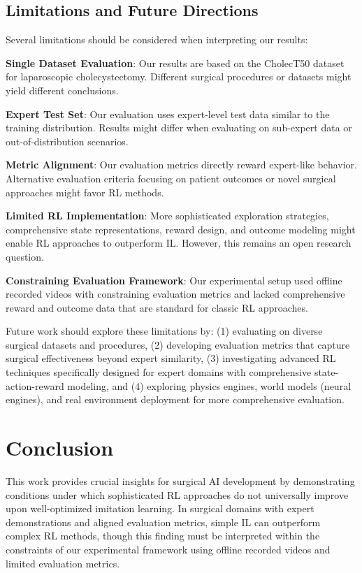 \documentclass[runningheads]{llncs}
\begin{document}
\subsection{Limitations and Future Directions}

Several limitations should be considered when interpreting our results:

\textbf{Single Dataset Evaluation}: Our results are based on the CholecT50 dataset for laparoscopic cholecystectomy. Different surgical procedures or datasets might yield different conclusions.

\textbf{Expert Test Set}: Our evaluation uses expert-level test data similar to the training distribution. Results might differ when evaluating on sub-expert data or out-of-distribution scenarios.

\textbf{Metric Alignment}: Our evaluation metrics directly reward expert-like behavior. Alternative evaluation criteria focusing on patient outcomes or novel surgical approaches might favor RL methods.

\textbf{Limited RL Implementation}: More sophisticated exploration strategies, comprehensive state representations, reward design, and outcome modeling might enable RL approaches to outperform IL. However, this remains an open research question.

\textbf{Constraining Evaluation Framework}: Our experimental setup used offline recorded videos with constraining evaluation metrics and lacked comprehensive reward and outcome data that are standard for classic RL approaches.

Future work should explore these limitations by: (1) evaluating on diverse surgical datasets and procedures, (2) developing evaluation metrics that capture surgical effectiveness beyond expert similarity, (3) investigating advanced RL techniques specifically designed for expert domains with comprehensive state-action-reward modeling, and (4) exploring physics engines, world models (neural engines), and real environment deployment for more comprehensive evaluation.


\section{Conclusion}

This work provides crucial insights for surgical AI development by demonstrating conditions under which sophisticated RL approaches do not universally improve upon well-optimized imitation learning. In surgical domains with expert demonstrations and aligned evaluation metrics, simple IL can outperform complex RL methods, though this finding must be interpreted within the constraints of our experimental framework using offline recorded videos and limited evaluation metrics.
\end{document}
